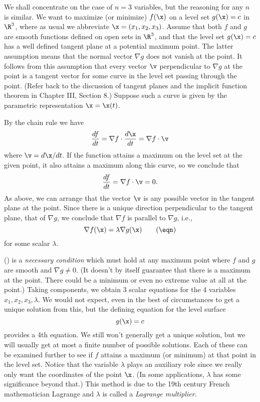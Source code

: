 We shall concentrate on the case of $n = 3$ variables,
but the reasoning for any $n$ is similar.
We want to maximize (or minimize) $f(\x)$
on a level set  $g(\x) = c$ in $\R^3$, where as usual we 
abbreviate 
$\x = (x_1, x_2, x_3)$.
 Assume that both $f$ and $g$ are smooth functions
defined on open sets in $\R^3$,
and that the level set $g(\x) = c$ has a well defined
tangent plane at a potential maximum point.
The latter assumption means that the normal vector $\nabla g$
does not vanish at the point.   It follows from this
assumption that every vector $\v$
perpendicular to $\nabla g$ at the point is a tangent vector
for some curve in the level set passing through the point.  (Refer back
to the discussion of tangent planes and the implicit function theorem
in Chapter III, Section 8.)
  Suppose such a curve is given by the parametric
representation $\x = \x(t)$.
\medskip
\centerline{}
\medskip
   By the chain rule we have
$$
\frac{df}{dt} = \nabla f\cdot\frac{d\x}{dt} = \nabla f\cdot\v
$$
where $\v = d\x/dt$.   If the function attains a maximum on the level set
at the given point, it also attains a maximum along this curve, so
we conclude that
$$
\frac{df}{dt} = \nabla f\cdot \v = 0.
$$
As above, we can arrange that the vector $\v$ is any possible
vector in the tangent plane at the point.    Since there is a
unique direction perpendicular to the tangent plane, that of $\nabla g$,
we conclude that $\nabla f$ is parallel to $\nabla g$, i.e.,
\nexteqn
$$
\nabla f(\x) = \lambda \nabla g(\x)\tag\eqn
$$
for some scalar $\lambda$.
\medskip
\centerline{}
\medskip
   (\eqn) is a {\it necessary condition\/}
which must hold at any maximum point where $f$ and $g$ are smooth
and $\nabla g \not= 0$.  (It doesn't by itself guarantee
that there is a maximum at the point.   There could be a minimum
or even no extreme value at all at the point.)  Taking components, 
we obtain 3 scalar equations
for the 4 variables  $x_1, x_2, x_3, \lambda$.   We would not expect,
even in the best of circumstances to get a unique solution from this,
but the defining equation for the level surface
\nexteqn
$$
g(\x) = c
$$
provides a 4th equation.   We still won't generally get a unique
solution, but we will usually get at most a finite number of possible
solutions.   Each of these can be examined further to see if $f$
attains a maximum (or minimum) at that point in the level set.
Notice that the variable $\lambda$ plays an auxiliary role since
we really only want the coordinates of the point $\x$.  (In some
applications, $\lambda$ has some significance beyond that.)
This method
is due to the 19th century French mathematician Lagrange and
$\lambda$ is called a {\it Lagrange multiplier}.
%

